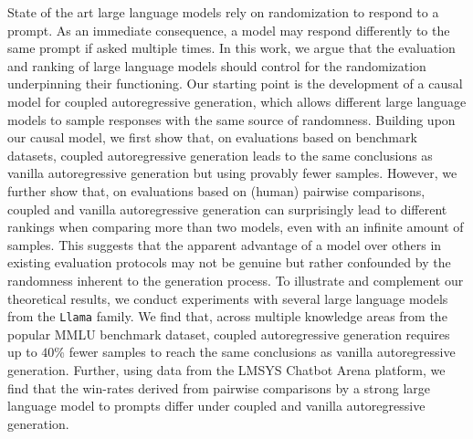 State of the art large language models rely on randomization to respond to a prompt. As an immediate consequence, a model may respond differently to the same prompt if asked multiple times.
%
In this work, we argue that the evaluation and ranking of large language models should control for the randomization underpinning their functioning.
%
Our starting point is the development of a causal model for coupled autoregressive generation, which allows different large language models to sample responses with the same source of randomness.
%
Building upon our causal model, we first show that, on evaluations based on benchmark datasets, coupled autoregressive generation leads to the same conclusions as vanilla autoregressive generation but using provably fewer samples. However, we further show that, on evaluations based on (human) pairwise comparisons, coupled and vanilla autoregressive generation can surprisingly lead to different rankings when comparing more than two models, even with an infinite amount of samples. This suggests that the apparent advantage of a model over others in existing evaluation protocols may not be genuine but rather confounded by the randomness inherent to the generation process.
% 
To illustrate and complement our theoretical results, we conduct experiments with several large language models from the \texttt{Llama} family.
%
We find that, across multiple knowledge areas from the popular MMLU benchmark dataset, coupled autoregressive generation requires up to $40$\% fewer samples to reach the same conclusions as vanilla autoregressive generation.
%
Further, using data from the LMSYS Chatbot Arena platform, we find that the win-rates derived from pairwise comparisons by a strong large language model to prompts differ under coupled and vanilla autoregressive generation.
